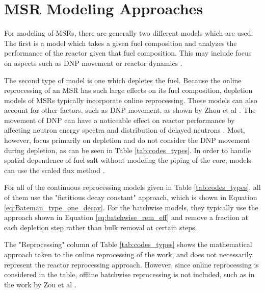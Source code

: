 \section{MSR Modeling Approaches}

For modeling of MSRs, there are generally two different models which are used. The first is a model which takes a given fuel composition and analyzes the performance of the reactor given that fuel composition. This may include focus on aspects such as DNP movement \cite{fei_molten_2020, shi_gen-foam_2021} or reactor dynamics \cite{singh_plant-level_2020, cervi_development_2019, aufiero_development_2014, cui_development_2022, singh_dynamics_2017}.

The second type of model is one which depletes the fuel. Because the online reprocessing of an MSR has such large effects on its fuel composition, depletion models of MSRs typically incorporate online reprocessing. These models can also account for other factors, such as DNP movement, as shown by Zhou et al \cite{zhou_fuel_2018}. The movement of DNP can have a noticeable effect on reactor performance by affecting neutron energy spectra and distribution of delayed neutrons \cite{betzler_implementation_2017}. Most, however, focus primarily on depletion and do not consider the DNP movement during depletion, as can be seen in Table \ref{tab:codes_types}. In order to handle spatial dependence of fuel salt without modeling the piping of the core, models can use the scaled flux method \cite{betzler_liquid-fueled_2021}.

For all of the continuous reprocessing models given in Table \ref{tab:codes_types}, all of them use the "fictitious decay constant" approach, which is shown in Equation \eqref{eq:Bateman_type_one_decay}. For the batchwise models, they typically use the approach shown in Equation \eqref{eq:batchwise_rem_eff} and remove a fraction at each depletion step rather than bulk removal at certain steps.

The "Reprocessing" column of Table \ref{tab:codes_types} shows the mathematical approach taken to the online reprocessing of the work, and does not necessarily represent the reactor reprocessing approach. However, since online reprocessing is considered in the table, offline batchwise reprocessing is not included, such as in the work by Zou et al \cite{zou_transition_2020}.



